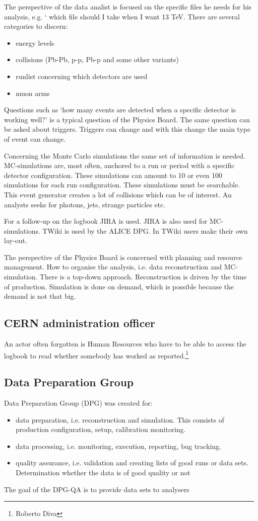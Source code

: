 The perspective of the data analist is focused on the specific files he needs for his analysis, e.g. ` which file should I take when I want 13 TeV. There are several categories to discern:
\begin{itemize}
  \item energy levels
  \item collisions (Pb-Pb, p-p, Pb-p and some other variants)
  \item runlist concerning which detectors are used
  \item muon arms
\end{itemize}
Questions such as `how many events are detected when a specific detector is working well?' is a typical question of the Physics Board. The same question can be asked about triggers. Triggers can change and with this change the main type of event can change.

Concerning the Monte Carlo simulations the same set of information is needed. MC-simulations are, most often, anchored to a run or period with a specific detector configuration. These simulations can amount to 10 or even 100 simulations for each run configuration. These simulations must be searchable. This event generator creates a lot of collisions which can be of interest. An analysts seeks for photons, jets, strange particles etc.

For a follow-up on the logbook JIRA is used. JIRA is also used for MC-simulations. TWiki is used by the ALICE DPG. In TWiki users make their own lay-out. 

The perspective of the Physics Board is concerned with planning and resource management. How to organise the analysis, i.e. data reconstruction and MC-simulation. There is a top-down approach. Reconstruction is driven by the time of production. Simulation is done on demand, which is possible because the demand is not that big. 

\subsection{CERN administration officer}
An actor often forgotten is Human Resources who have to be able to access the logbook to read whether somebody has worked as reported.\footnote{Roberto Diva}


\subsection{Data Preparation Group}
Data Preparation Group (DPG) was created for:
\begin{itemize}
  \item data preparation, i.e. reconstruction and simulation. This consists of production configuration, setup, calibration monitoring.
  \item data processing, i.e. monitoring, execution, reporting, bug tracking.
  \item quality assurance, i.e. validation and creating lists of good runs or data sets. Determination whether the data is of good quality or not
\end{itemize}
The goal of the DPG-QA is to provide data sets to analysers

